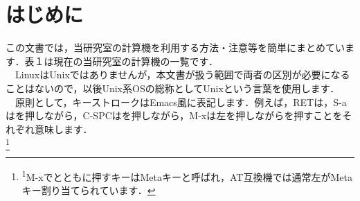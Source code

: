 \documentclass[main]{subfiles}
\begin{document}
\chapter{はじめに}

\fontsize{10.2}{15} \selectfont
この文書では，当研究室の計算機を利用する方法・注意等を簡単にまとめています．表１は現在の当研究室の計算機の一覧です．\\
　LinuxはUnixではありませんが，本文書が扱う範囲で両者の区別が必要になることはないので，以後Unix系OSの総称としてUnixという言葉を使用します．\\
　原則として，キーストロークはEmacs風に表記します．例えば，RETは，S-aはを押しながら，C-SPCはを押しながら，M-xは左を押しながらを押すことをそれぞれ意味します．\\
\footnote{\textsuperscript{1}M-xでとともに押すキーはMetaキーと呼ばれ，AT互換機では通常左がMetaキー割り当てられています．}
\end{document}
